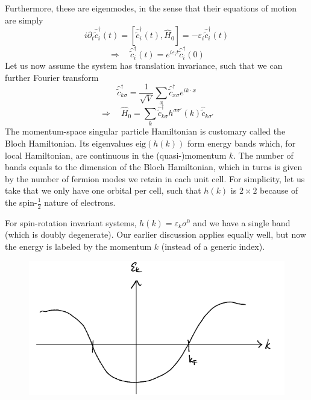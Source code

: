 Furthermore, these are eigenmodes, in the sense that their equations of motion are simply
\[ i\partial _t\hat{\tilde{c}}_{i}^{\dagger}\left( t \right) =\left[ \hat{\tilde{c}}_{i}^{\dagger}\left( t \right) ,\hat{H}_0 \right] =-\varepsilon _i\hat{\tilde{c}}_{i}^{\dagger}\left( t \right) \]
\[ \Rightarrow \quad \hat{\tilde{c}}_{i}^{\dagger}\left( t \right) =e^{i\varepsilon _it}\hat{\tilde{c}}_{i}^{\dagger}\left( 0 \right) \]
Let us now assume the system has translation invariance, such that we can further Fourier transform
\[ \hat{\tilde{c}}_{k\sigma}^{\dagger}=\frac{1}{\sqrt{V}}\sum_x{\hat{\tilde{c}}_{x\sigma}^{\dagger}e^{ik\cdot x}}\]
\[ \Rightarrow \quad \hat{H}_0=\sum_k{\hat{\tilde{c}}_{k\sigma}^{\dagger}h^{\sigma \sigma '}\left( k \right) \hat{\tilde{c}}_{k\sigma '}}\]
The momentum-space singular particle Hamiltonian is customary called the Bloch Hamiltonian. Its eigenvalues $\text{eig}(h(k))$ form energy bands which, for local Hamiltonian, are continuous in the (quasi-)momentum $k$. The number of bands equals to the dimension of the Bloch Hamiltonian, which in turns is given by the number of fermion modes we retain in each unit cell. For simplicity, let us take that we only have one orbital per cell, such that $h(k)$ is $2\times 2$ because of the spin-$\frac{1}{2}$ nature of electrons.

For spin-rotation invariant systems, $h\left( k \right) =\varepsilon _k\sigma ^0$ and we have a single band (which is doubly degenerate). Our earlier discussion applies equally well, but now the energy is labeled by the momentum $k$ (instead of a generic index).

\begin{figure}[ht]
    \centering
    \includegraphics[width=\textwidth]{jupyterbook/data/fig/lec15-fig00.png}
\end{figure}

